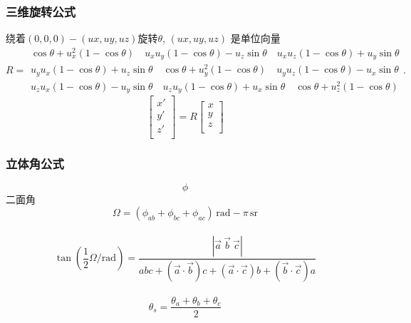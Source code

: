 \subsubsection{三维旋转公式}
绕着$(0,0,0)-(ux,uy,uz)$旋转$\theta$, $(ux,uy,uz)$ 是单位向量
\[
R = \begin{smallmatrix} \cos \theta +u_x^2 \left(1-\cos \theta\right) \quad u_x u_y \left(1-\cos \theta\right) - u_z \sin \theta \quad u_x u_z \left(1-\cos \theta\right) + u_y \sin \theta \\ u_y u_x \left(1-\cos \theta\right) + u_z \sin \theta \quad \cos \theta + u_y^2\left(1-\cos \theta\right) \quad u_y u_z \left(1-\cos \theta\right) - u_x \sin \theta \\ u_z u_x \left(1-\cos \theta\right) - u_y \sin \theta \quad u_z u_y \left(1-\cos \theta\right) + u_x \sin \theta \quad \cos \theta + u_z^2\left(1-\cos \theta\right) 
\end{smallmatrix}.
\]
\[
\begin{bmatrix}
x' \\
y' \\
z' \\
\end{bmatrix} = R
\begin{bmatrix}
x \\
y \\
z \\
\end{bmatrix}
\]
\subsubsection{立体角公式}
\[ \phi \] 二面角\\
\[ \Omega = \left(\phi_{ab} + \phi_{bc} + \phi_{ac}\right)\,\mathrm{rad} - \pi\,\mathrm{sr} \]\\
\[\tan \left( \frac{1}{2} \Omega/\mathrm{rad} \right) =
  \frac{\left|\vec a\ \vec b\ \vec c\right|}{abc + \left(\vec a \cdot \vec b\right)c + \left(\vec a \cdot \vec c\right)b + \left(\vec b \cdot \vec c\right)a}\]\\
\[\theta_s = \frac {\theta_a + \theta_b + \theta_c}{2}\]\\

